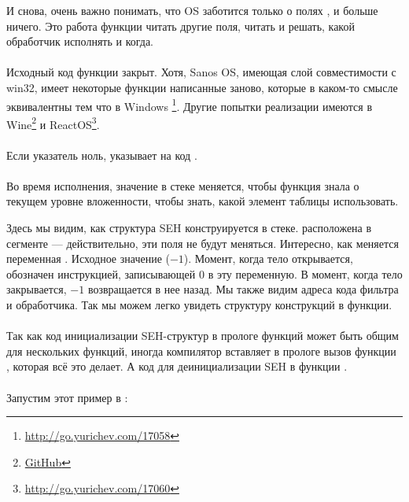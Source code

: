 

И снова, очень важно понимать, что OS заботится только о полях , и больше ничего.
Это работа функции  читать другие поля, читать  и решать, какой обработчик исполнять и когда.\\
\\
Исходный код функции  закрыт.
Хотя, Sanos OS, имеющая слой совместимости с win32, имеет некоторые функции написанные заново, которые
в каком-то смысле эквивалентны тем что в Windows
\footnote{\url{http://go.yurichev.com/17058}}.
Другие попытки реализации имеются в 
Wine\footnote{\href{http://go.yurichev.com/17059}{GitHub}}
и ReactOS\footnote{\url{http://go.yurichev.com/17060}}.\\
\\
Если указатель  ноль,  указывает на код  .\\
\\
Во время исполнения, значение  в стеке меняется, чтобы функция
 знала о текущем уровне вложенности, чтобы знать, какой элемент таблицы
 использовать.






Здесь мы видим, как структура SEH конструируется в стеке.
 расположена в сегменте  --- действительно, эти поля не будут меняться.
Интересно, как меняется переменная .
Исходное значение  ($-1$).
Момент, когда тело  открывается, обозначен инструкцией, записывающей 0 в эту переменную.
В момент, когда тело  закрывается, $-1$ возвращается в нее назад.
Мы также видим адреса кода фильтра и обработчика.
Так мы можем легко увидеть структуру конструкций  в функции.\\
\\
Так как код инициализации SEH-структур в прологе функций может быть общим для нескольких функций, иногда компилятор
вставляет в прологе вызов функции , которая всё это делает.
А код для деинициализации SEH в функции .\\
\\
Запустим этот пример в \tracer{}:

